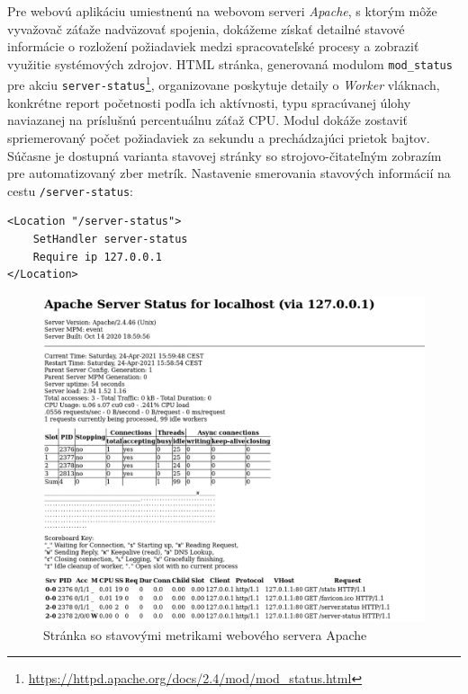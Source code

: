 \documentclass[12pt, a4paper]{article}
\begin{document}
Pre webovú aplikáciu umiestnenú na webovom serveri \emph{Apache}, s ktorým môže vyvažovač záťaže nadväzovať
spojenia, dokážeme získať detailné stavové informácie o rozložení požiadaviek medzi spracovateľské procesy a 
zobraziť využitie systémových zdrojov. HTML stránka, generovaná modulom \verb|mod_status| pre akciu
\verb|server-status|\footnote{\url{https://httpd.apache.org/docs/2.4/mod/mod_status.html}}, organizovane 
poskytuje detaily o \emph{Worker} vláknach, konkrétne report početnosti podľa ich aktívnosti,
typu spracúvanej úlohy naviazanej na príslušnú percentuálnu záťaž CPU. Modul dokáže zostaviť spriemerovaný 
počet požiadaviek za sekundu a prechádzajúci prietok bajtov. Súčasne je dostupná varianta stavovej stránky 
so strojovo-čitateľným zobrazím pre automatizovaný zber metrík. Nastavenie smerovania stavových informácií 
na cestu \verb|/server-status|:
\begin{lstlisting}
<Location "/server-status">
    SetHandler server-status
    Require ip 127.0.0.1
</Location>
\end{lstlisting}
\begin{figure}[h]
  \centering
  \includegraphics[width=.7\textwidth]{images/Apache-Stats.png}
  \caption{Stránka so stavovými metrikami webového servera Apache}
\end{figure}
\end{document}
